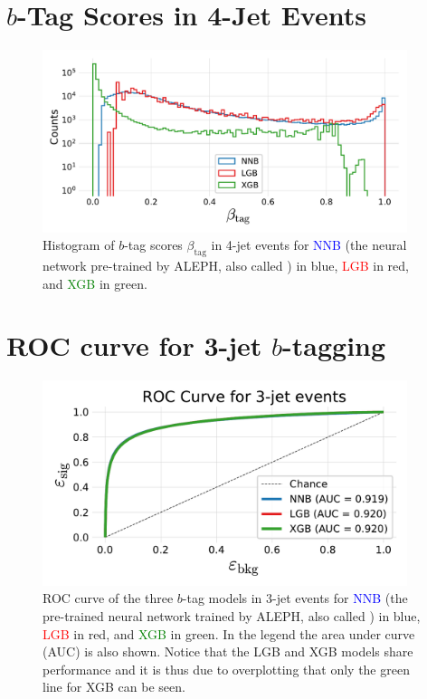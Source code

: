 \section[b-Tag Scores in 4-Jet Events]{$b$-Tag Scores in 4-Jet Events}
\begin{figure}
  \includegraphics[width=0.95\textwidth, trim=0 0 0 30, clip]{figures/quarks/y_pred_4_jet_hist-down_sample=1.00-ML_vars=vertex-selection=b-ejet_min=4-n_iter_RS_lgb=99-n_iter_RS_xgb=9-cdot_cut=0.90-version=19.pdf}
  \caption[$b$-Tag Scores in 4-Jet Events]
          {Histogram of $b$-tag scores $\beta_\mathrm{tag}$ in 4-jet events for \textcolor{blue}{NNB} (the neural network pre-trained by ALEPH, also called ) in blue, \textcolor{red}{LGB} in red, and \textcolor{green}{XGB} in green. 
          } 
\end{figure}
\clearpage

\FloatBarrier
\section[ROC curve for 3-jet b-tagging]{ROC curve for 3-jet $b$-tagging}
\begin{figure}
  \includegraphics[width=0.95\textwidth, trim=10 10 10 40, clip]{figures/quarks/ROC_3_jet-down_sample=1.00-ML_vars=vertex-selection=b-ejet_min=4-n_iter_RS_lgb=99-n_iter_RS_xgb=9-cdot_cut=0.90-version=19.pdf}
  \caption[ROC curve for 3-jet $b$-tagging]
          {ROC curve of the three $b$-tag models in 3-jet events for \textcolor{blue}{NNB} (the pre-trained neural network trained by ALEPH, also called ) in blue, \textcolor{red}{LGB} in red, and \textcolor{green}{XGB} in green. In the legend the area under curve (AUC) is also shown. Notice that the LGB and XGB models share performance and it is thus due to overplotting that only the green line for XGB can be seen.} 
  \label{fig:q:roc_btag_3j}
\end{figure}
\vspace{2cm}
